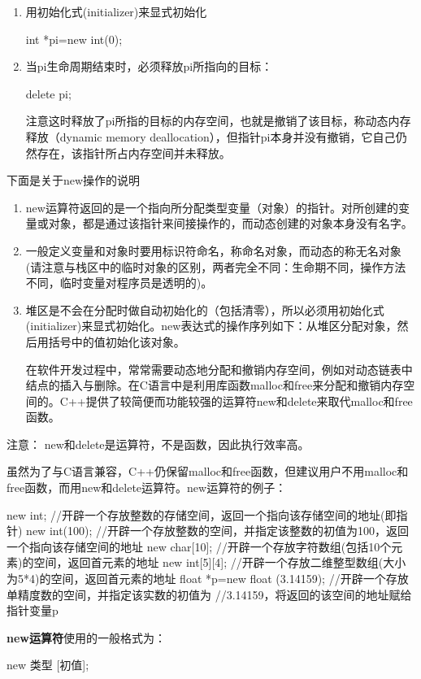 \begin{enumerate}
	\item 用初始化式(initializer)来显式初始化
	
	int *pi=new int(0);
	\item 当pi生命周期结束时，必须释放pi所指向的目标：
	
	delete pi;
	
	注意这时释放了pi所指的目标的内存空间，也就是撤销了该目标，称动态内存释放（dynamic memory deallocation），但指针pi本身并没有撤销，它自己仍然存在，该指针所占内存空间并未释放。
\end{enumerate}
下面是关于new操作的说明
\begin{enumerate}
	\item new运算符返回的是一个指向所分配类型变量（对象）的指针。对所创建的变量或对象，都是通过该指针来间接操作的，而动态创建的对象本身没有名字。
	
	\item 一般定义变量和对象时要用标识符命名，称命名对象，而动态的称无名对象(请注意与栈区中的临时对象的区别，两者完全不同：生命期不同，操作方法不同，临时变量对程序员是透明的)。
	\item 堆区是不会在分配时做自动初始化的（包括清零），所以必须用初始化式(initializer)来显式初始化。new表达式的操作序列如下：从堆区分配对象，然后用括号中的值初始化该对象。
	
	在软件开发过程中，常常需要动态地分配和撤销内存空间，例如对动态链表中结点的插入与删除。在C语言中是利用库函数malloc和free来分配和撤销内存空间的。C++提供了较简便而功能较强的运算符new和delete来取代malloc和free函数。
\end{enumerate}


注意： new和delete是运算符，不是函数，因此执行效率高。

虽然为了与C语言兼容，C++仍保留malloc和free函数，但建议用户不用malloc和free函数，而用new和delete运算符。new运算符的例子：
\begin{Code}
new int;  //开辟一个存放整数的存储空间，返回一个指向该存储空间的地址(即指针)
new int(100);  //开辟一个存放整数的空间，并指定该整数的初值为100，返回一个指向该存储空间的地址
new char[10];  //开辟一个存放字符数组(包括10个元素)的空间，返回首元素的地址
new int[5][4];  //开辟一个存放二维整型数组(大小为5*4)的空间，返回首元素的地址
float *p=new float (3.14159);  //开辟一个存放单精度数的空间，并指定该实数的初值为
			//3.14159，将返回的该空间的地址赋给指针变量p
\end{Code}
\textbf{new运算符}使用的一般格式为：

new 类型 [初值];

